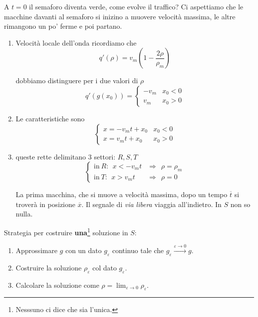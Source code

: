 \documentclass[10pt,a4paper,twoside,openright]{book}
\begin{document}
A $t=0$ il semaforo diventa verde, come evolve il traffico? Ci aspettiamo che le macchine davanti al semaforo si inizino a muovere velocità massima, le altre rimangono un po' ferme e poi partano.
\begin{enumerate}
	\item Velocità locale dell'onda ricordiamo che
	      \begin{equation*}
	      	q'( \rho ) =v_{m}\left( 1-\frac{2\rho }{\rho _{m}}\right)
	      \end{equation*}
	      
	      dobbiamo distinguere per i due valori di $\rho $
	      \begin{equation*}
	      	q'( g( x_{0})) =
	      	\begin{cases}
	      		-v_{m} & x_{0} < 0 \\
	      		v_{m}  & x_{0}  >0 
	      	\end{cases}
	      \end{equation*}
	\item Le caratteristiche sono
	      \begin{equation*}
	      	\begin{cases}
	      		x=-v_{m} t+x_{0} & x_{0} < 0 \\
	      		x=v_{m} t+x_{0}  & x_{0}  >0 
	      	\end{cases}
	      \end{equation*}
	      
	\item queste rette delimitano $3$ settori: $R,S,T$
	      \begin{equation*}
	      	\begin{cases}
	      		\text{in} \ R:\ \ x< -v_{m} t & \Rightarrow \ \ \rho =\rho _{m} \\
	      		\text{in} \ T:\ \ x >v_{m} t  & \Rightarrow \ \ \rho =0         
	      	\end{cases}
	      \end{equation*}
	      
	      La prima macchina, che si muove a velocità massima, dopo un tempo $\overline{t}$ si troverà in posizione $\overline{x}$. Il segnale di \textit{via libera} viaggia all'indietro. In $S$ non so nulla. 
\end{enumerate}

Strategia per costruire \textbf{una}\footnote{Nesssuno ci dice che sia l'unica.} soluzione in $S$:
\begin{enumerate}
	\item Approssimare $g$ con un dato $g_{\varepsilon }$ continuo tale che $g_{\varepsilon }\xrightarrow{\varepsilon \rightarrow 0} g$.
	\item Costruire la soluzione $\rho _{\varepsilon }$ col dato $g_{\varepsilon }$.
	\item Calcolare la soluzione come $\rho =\lim _{\varepsilon \rightarrow 0} \rho _{\varepsilon }$.
\end{enumerate}
\end{document}
